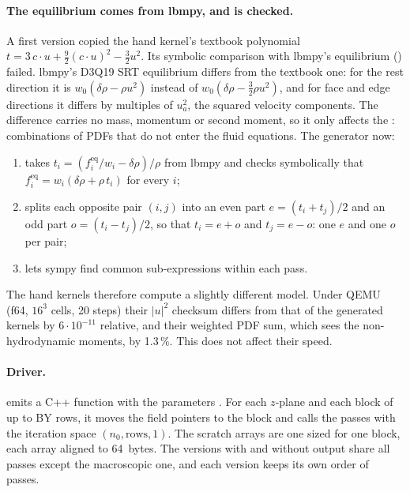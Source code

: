 \paragraph{The equilibrium comes from lbmpy, and is checked.} A first version copied the hand
kernel's textbook polynomial $t = 3\,c\cdot u + \tfrac92 (c\cdot u)^2 - \tfrac32 u^2$. Its
symbolic comparison with lbmpy's equilibrium () failed.
lbmpy's D3Q19 SRT equilibrium differs from the textbook one: for the rest direction it is
$w_0(\delta\rho - \rho u^2)$ instead of $w_0(\delta\rho - \tfrac32 \rho u^2)$, and for face and
edge directions it differs by multiples of $u_a^2$, the squared velocity components. The
difference carries no mass, momentum or second moment, so it only affects the
: combinations of PDFs that do not enter the fluid equations. The
generator now:
\begin{enumerate}
  \item takes $t_i = (f^{\mathrm{eq}}_i / w_i - \delta\rho) / \rho$ from lbmpy and checks
        symbolically that $f^{\mathrm{eq}}_i = w_i (\delta\rho + \rho\, t_i)$ for every $i$;
  \item splits each opposite pair $(i, j)$ into an even part $e = (t_i + t_j)/2$ and an odd part
        $o = (t_i - t_j)/2$, so that $t_i = e + o$ and $t_j = e - o$: one $e$ and one $o$ per
        pair;
  \item lets sympy find common sub-expressions within each pass.
\end{enumerate}
The hand kernels therefore compute a slightly different model. Under QEMU (f64, $16^3$ cells,
20 steps) their $|u|^2$ checksum differs from that of the generated kernels by
$6\cdot10^{-11}$ relative, and their weighted PDF sum, which sees the non-hydrodynamic moments,
by 1.3\,\%. This does not affect their speed.

\paragraph{Driver.}  emits a C++ function with the parameters
. For each $z$-plane and each block
of up to BY rows, it moves the field pointers to the block and calls the passes with the
iteration space $(n_0, \text{rows}, 1)$. The scratch arrays are one 
sized for one block, each array aligned to 64~bytes. The versions with and without output share
all passes except the macroscopic one, and each version keeps its own order of passes.

